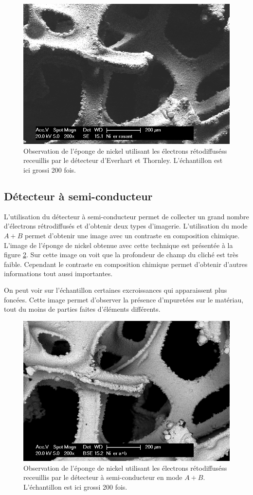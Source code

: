 \documentclass[a4paper,12pt]{article}
\newcommand\ett{Everhart et Thornley\xspace}
\begin{document}
\begin{figure}
\centering
\includegraphics[width = 0.7 \textwidth]{images/ni_er_rasant.png}
\caption{Observation de l'éponge de nickel utilisant les électrons rétodiffuséss receuillis par le détecteur d'\ett. L'échantillon est ici grossi 200 fois.}
\label{fig:ni_er_rasant}
\end{figure}


\subsection{Détecteur à semi-conducteur}

L'utilisation du détecteur à semi-conducteur permet de collecter un grand nombre d'électrons rétrodiffusés
et d'obtenir deux types d'imagerie. L'utilisation du mode $A+B$ permet d'obtenir une image avec un contraste
en composition chimique. L'image de l'éponge de nickel obtenue avec cette technique est présentée à la figure
\ref{fig:ni_er_apb}. Sur cette image on voit que la profondeur de champ du cliché est très faible. Cependant
le contraste en composition chimique permet d'obtenir d'autres informations tout aussi importantes.

On peut voir sur l'échantillon certaines excroissances qui apparaissent plus foncées. Cette image permet d'observer
la présence d'mpuretées sur le matériau, tout du moins de parties faites d'éléments différents.


\begin{figure}
\centering
\includegraphics[width = 0.7 \textwidth]{images/ni_er_apb.png}
\caption{Observation de l'éponge de nickel utilisant les électrons rétodiffuséss receuillis par le détecteur à semi-conducteur en mode $A+B$. L'échantillon est ici grossi 200 fois.}
\label{fig:ni_er_apb}
\end{figure}
\end{document}
